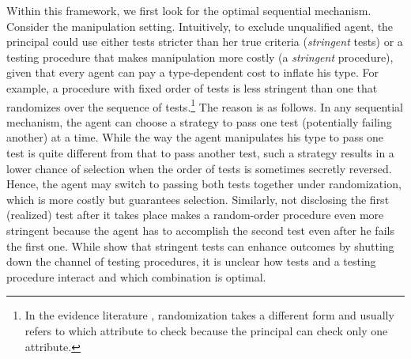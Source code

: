 Within this framework, we first look for the optimal sequential mechanism.
Consider the manipulation setting.
Intuitively, to exclude unqualified agent, the principal could use either tests stricter than her true criteria (\emph{stringent} tests) or a testing procedure that makes manipulation more costly (a \emph{stringent} procedure), given that every agent can pay a type-dependent cost to inflate his type.
For example, a procedure with fixed order of tests is less stringent than one that randomizes over the sequence of tests.\footnote{In the evidence literature \citep[e.g.,][]{glazer2004optimal, sher2014persuasion}, randomization takes a different form and usually refers to which attribute to check because the principal can check only one attribute.}
The reason is as follows.
In any sequential mechanism, the agent can choose a strategy to pass one test (potentially failing another) at a time. 
While the way the agent manipulates his type to pass one test is quite different from that to pass another test, such a strategy results in a lower chance of selection when  the order of tests is sometimes secretly reversed.
Hence, the agent may switch to passing both tests together under randomization, which is more costly but guarantees selection.
Similarly, not disclosing the first (realized) test after it takes place makes a random-order procedure even more stringent because the agent has to accomplish the second test even after he fails the first one.
While \citet{perez2022test,zigzag} show that stringent tests can enhance outcomes by shutting down the channel of testing procedures, it is unclear how tests and a testing procedure interact and which combination is optimal.
 
